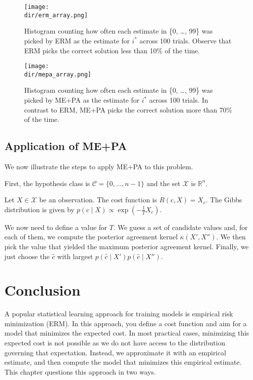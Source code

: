 \begin{figure}
\centering
\texttt{[image: \\dir/erm\_array.png]}
\caption{Histogram counting how often each estimate in \{0, \ldots, 99\} was picked by ERM as the estimate for $i^*$ across 100 trials. Observe that ERM picks the correct solution less than 10\% of the time.}
\label{fig:erm_array}
\end{figure}

\begin{figure}
\centering
\texttt{[image: \\dir/mepa\_array.png]}
\caption{Histogram counting how often each estimate in \{0, \ldots, 99\} was picked by ME+PA as the estimate for $i^*$ across 100 trials. In contrast to ERM, ME+PA picks the correct solution more than 70\% of the time.}
\label{fig:mepa_array}
\end{figure}

\subsection{Application of ME+PA}

We now illustrate the steps to apply ME+PA to this problem.

First, the hypothesis class is $\mathcal{C} = \{0, \ldots, n-1\}$ and the set $\mathcal{X}$ is $\mathbb{R}^n$.

Let $X \in \mathcal{X}$ be an observation. The cost function is $R(c, X) = X_c$. The Gibbs distribution is given by $p(c \mid X) \propto \exp\left(-\frac{1}{T} X_c\right)$. 

We now need to define a value for $T$. We guess a set of candidate values and, for each of them, we compute the posterior agreement kernel $\kappa(X', X'')$. We then pick the value that yielded the maximum posterior agreement kernel. Finally, we just choose the $\hat{c}$ with largest $p(\hat{c} \mid X')p(\hat{c} \mid X'')$.

\section{Conclusion}

A popular statistical learning approach for training models is empirical risk minimization (ERM). In this approach, you define a cost function and aim for a model that minimizes the expected cost. In most practical cases, minimizing this expected cost is not possible as we do not have access to the distribution governing that expectation. Instead, we approximate it with an empirical estimate, and then compute the model that minimizes this empirical estimate. This chapter questions this approach in two ways. 

